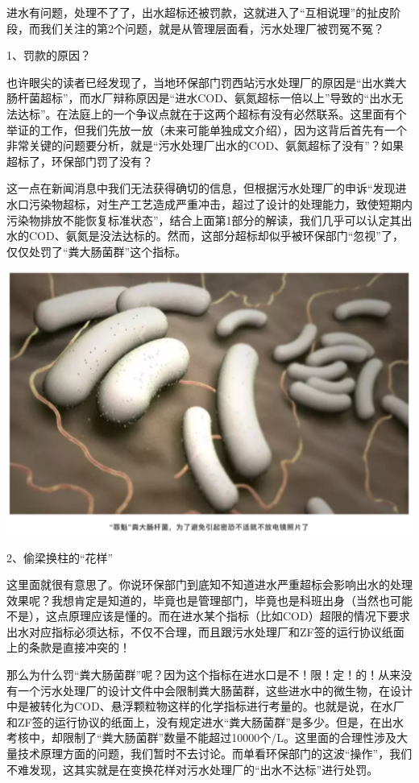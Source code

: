 \documentclass[
]{book}
\begin{document}
进水有问题，处理不了了，出水超标还被罚款，这就进入了``互相说理''的扯皮阶段，而我们关注的第2个问题，就是从管理层面看，污水处理厂被罚冤不冤？

1、罚款的原因？

也许眼尖的读者已经发现了，当地环保部门罚西站污水处理厂的原因是``出水粪大肠杆菌超标''，而水厂辩称原因是``进水COD、氨氮超标一倍以上''导致的``出水无法达标''。在法庭上的一个争议点就在于这两个超标有没有必然联系。这里面有个举证的工作，但我们先放一放（未来可能单独成文介绍），因为这背后首先有一个非常关键的问题要分析，就是``污水处理厂出水的COD、氨氮超标了没有''？如果超标了，环保部门罚了没有？

这一点在新闻消息中我们无法获得确切的信息，但根据污水处理厂的申诉``发现进水口污染物超标，对生产工艺造成严重冲击，超过了设计的处理能力，致使短期内污染物排放不能恢复标准状态''，结合上面第1部分的解读，我们几乎可以认定其出水的COD、氨氮是没法达标的。然而，这部分超标却似乎被环保部门``忽视''了，仅仅处罚了``粪大肠菌群''这个指标。

\includegraphics[width=6.67in]{images/py2}

2、偷梁换柱的``花样''

这里面就很有意思了。你说环保部门到底知不知道进水严重超标会影响出水的处理效果呢？我想肯定是知道的，毕竟也是管理部门，毕竟也是科班出身（当然也可能不是），这点原理应该是懂的。而在进水某个指标（比如COD）超限的情况下要求出水对应指标必须达标，不仅不合理，而且跟污水处理厂和ZF签的运行协议纸面上的条款是直接冲突的！

那么为什么罚``粪大肠菌群''呢？因为这个指标在进水口是不！限！定！的！从来没有一个污水处理厂的设计文件中会限制粪大肠菌群，这些进水中的微生物，在设计中是被转化为COD、悬浮颗粒物这样的化学指标进行考量的。也就是说，在水厂和ZF签的运行协议的纸面上，没有规定进水``粪大肠菌群''是多少。但是，在出水考核中，却限制了``粪大肠菌群''数量不能超过10000个/L。这里面的合理性涉及大量技术原理方面的问题，我们暂时不去讨论。而单看环保部门的这波``操作''，我们不难发现，这其实就是在变换花样对污水处理厂的``出水不达标''进行处罚。
\end{document}
